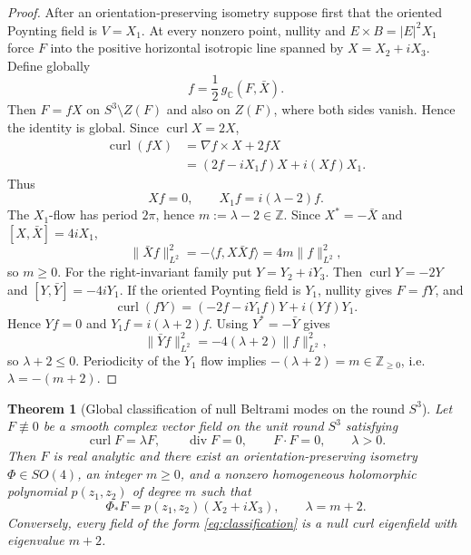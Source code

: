\documentclass[aps,prd,reprint,nofootinbib,superscriptaddress]{revtex4-2}
\newtheorem{theorem}{Theorem}[section]
\theoremstyle{definition}
\theoremstyle{remark}
\newcommand{\C}{\mathbb{C}}
\newcommand{\Div}{\operatorname{div}}
\newcommand{\Curl}{\operatorname{curl}}
\begin{document}
\begin{proof}
After an orientation-preserving isometry suppose first that the oriented Poynting field is $V=X_1$. At every nonzero point, nullity and $E\times B=|E|^2X_1$ force $F$ into the positive horizontal isotropic line spanned by $X=X_2+iX_3$. Define globally
\begin{equation}
f=\frac12\,g_\C(F,\bar X).
\label{eq:fglobal}
\end{equation}
Then $F=fX$ on $S^3\setminus Z(F)$ and also on $Z(F)$, where both sides vanish. Hence the identity is global. Since $\Curl X=2X$,
\begin{align}
\Curl(fX)
&=\nabla f\times X+2fX\nonumber\\
&=(2f-iX_1f)X+i(Xf)X_1.
\end{align}
Thus
\begin{equation}
Xf=0,
\qquad
X_1f=i(\lambda-2)f.
\label{eq:CRsystem}
\end{equation}
The $X_1$-flow has period $2\pi$, hence $m:=\lambda-2\in\mathbb Z$. Since $X^*=-\bar X$ and $[X,\bar X]=4iX_1$,
\begin{equation}
\|\bar Xf\|_{L^2}^2
=-\langle f,X\bar Xf\rangle
=4m\|f\|_{L^2}^2,
\label{eq:L2identity}
\end{equation}
so $m\ge0$. For the right-invariant family put $Y=Y_2+iY_3$.  Then
$\Curl Y=-2Y$ and $[Y,\bar Y]=-4iY_1$.  If the oriented Poynting field is $Y_1$, nullity gives $F=fY$, and
\begin{equation}
\Curl(fY)=(-2f-iY_1f)Y+i(Yf)Y_1.
\end{equation}
Hence $Yf=0$ and $Y_1f=i(\lambda+2)f$.  Using $Y^*=-\bar Y$ gives
\begin{equation}
\|\bar Yf\|_{L^2}^2=-4(\lambda+2)\|f\|_{L^2}^2,
\end{equation}
so $\lambda+2\le0$.  Periodicity of the $Y_1$ flow implies $-(\lambda+2)=m\in\mathbb Z_{\ge0}$, i.e. $\lambda=-(m+2)$.
\end{proof}

\begin{theorem}[Global classification of null Beltrami modes on the round $S^3$]
\label{thm:classification}
Let $F\not\equiv0$ be a smooth complex vector field on the unit round $S^3$ satisfying
\[
\Curl F=\lambda F,
\qquad \Div F=0,
\qquad F\cdot F=0,
\qquad \lambda>0.
\]
Then $F$ is real analytic and there exist an orientation-preserving isometry $\Phi\in SO(4)$, an integer $m\ge0$, and a nonzero homogeneous holomorphic polynomial $p(z_1,z_2)$ of degree $m$ such that
\begin{equation}
\boxed{\quad
\Phi_*F=p(z_1,z_2)(X_2+iX_3),
\qquad
\lambda=m+2.
\quad}
\label{eq:classification}
\end{equation}
Conversely, every field of the form \eqref{eq:classification} is a null curl eigenfield with eigenvalue $m+2$.
\end{theorem}
\end{document}
